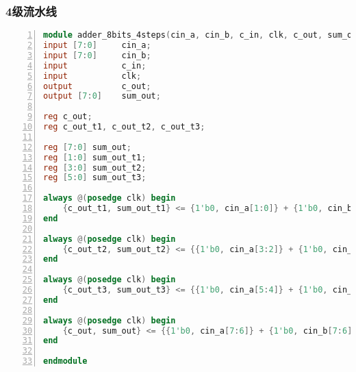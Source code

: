 \subsubsection{4级流水线}
\begin{lstlisting}[language=Verilog,label=lst:4_stage_pipeline,caption=8bit全加器4级流水线实现,numbers=left,xleftmargin=5em,xrightmargin=5em, aboveskip=2em]
module adder_8bits_4steps(cin_a, cin_b, c_in, clk, c_out, sum_out);
input [7:0]     cin_a;
input [7:0]     cin_b;
input           c_in;
input           clk;
output          c_out;
output [7:0]    sum_out;
	 
reg c_out;
reg c_out_t1, c_out_t2, c_out_t3;
	 
reg [7:0] sum_out;
reg [1:0] sum_out_t1;
reg [3:0] sum_out_t2;
reg [5:0] sum_out_t3;
	 
always @(posedge clk) begin
    {c_out_t1, sum_out_t1} <= {1'b0, cin_a[1:0]} + {1'b0, cin_b[1:0]} + c_in;
end
	 
always @(posedge clk) begin
    {c_out_t2, sum_out_t2} <= {{1'b0, cin_a[3:2]} + {1'b0, cin_b[3:2]} + c_out_t1, sum_out_t1};
end
	 
always @(posedge clk) begin
    {c_out_t3, sum_out_t3} <= {{1'b0, cin_a[5:4]} + {1'b0, cin_b[5:4]} + c_out_t2, sum_out_t2};
end
	 
always @(posedge clk) begin
    {c_out, sum_out} <= {{1'b0, cin_a[7:6]} + {1'b0, cin_b[7:6]} + c_out_t3, sum_out_t3};
end

endmodule
\end{lstlisting}
